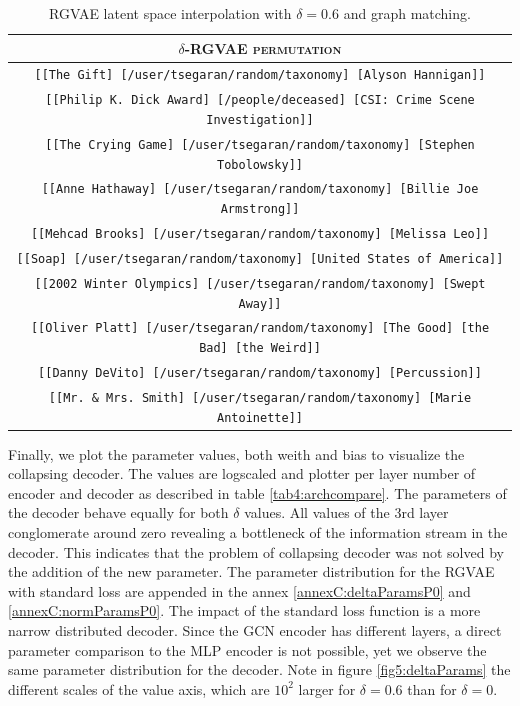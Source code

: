\begin{table}[H]
  \centering
  \begin{tabular}{|c|}
  \hline
  \rowcolor[HTML]{EFEFEF} 
  \textsc{$\delta$-RGVAE permutation}\\ \hline
  \texttt{[[The Gift] [/user/tsegaran/random/taxonomy] [Alyson Hannigan]]}\\
  \texttt{[[Philip K. Dick Award] [/people/deceased] [CSI: Crime Scene Investigation]]}\\
  \texttt{[[The Crying Game] [/user/tsegaran/random/taxonomy] [Stephen Tobolowsky]]}\\
  \texttt{[[Anne Hathaway] [/user/tsegaran/random/taxonomy] [Billie Joe Armstrong]]}\\
  \texttt{[[Mehcad Brooks] [/user/tsegaran/random/taxonomy] [Melissa Leo]]}\\
  \texttt{[[Soap] [/user/tsegaran/random/taxonomy] [United States of America]]}\\
  \texttt{[[2002 Winter Olympics] [/user/tsegaran/random/taxonomy] [Swept Away]]}\\
  \texttt{[[Oliver Platt] [/user/tsegaran/random/taxonomy] [The Good] [the Bad] [the Weird]]}\\
  \texttt{[[Danny DeVito] [/user/tsegaran/random/taxonomy] [Percussion]]}\\
  \texttt{[[Mr. \& Mrs. Smith] [/user/tsegaran/random/taxonomy] [Marie Antoinette]]}\\  \hline
  \end{tabular}
\caption{RGVAE latent space interpolation with $\delta = 0.6$ and graph matching.}
\label{tab5:ipbtw2Delta}
\end{table}

Finally, we plot the parameter values, both weith and bias to visualize the collapsing decoder. The values are logscaled and plotter per layer number of encoder and decoder as described in table \ref{tab4:archcompare}. The parameters of the decoder behave equally for both $\delta$ values. All values of the 3rd layer conglomerate around zero revealing a bottleneck of the information stream in the decoder. This indicates that the problem of collapsing decoder was not solved by the addition of the new parameter. The parameter distribution for the RGVAE with standard loss are appended in the annex \ref{annexC:deltaParamsP0} and \ref{annexC:normParamsP0}. The impact of the standard loss function is a more narrow distributed decoder. Since the GCN encoder has different layers, a direct parameter comparison to the MLP encoder is not possible, yet we observe the same parameter distribution for the decoder. Note in figure \ref{fig5:deltaParams} the different scales of the value axis, which are $10^2$ larger for $\delta = 0.6$ than for $\delta = 0$.

